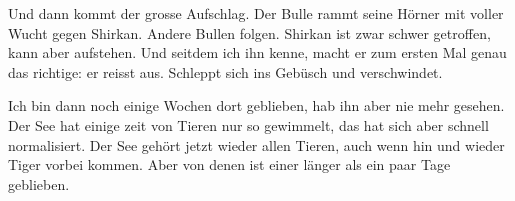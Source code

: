 Und dann kommt der grosse Aufschlag. Der Bulle rammt seine Hörner mit voller Wucht gegen Shirkan. Andere Bullen folgen. Shirkan ist zwar schwer getroffen, kann aber aufstehen. Und seitdem ich ihn kenne, macht er zum ersten Mal genau das richtige: er reisst aus. Schleppt sich ins Gebüsch und verschwindet. 

Ich bin dann noch einige Wochen dort geblieben, hab ihn aber nie mehr gesehen. Der See hat einige zeit von Tieren nur so gewimmelt, das hat sich aber schnell normalisiert. Der See gehört jetzt wieder allen Tieren, auch wenn hin und wieder Tiger vorbei kommen. Aber von denen ist einer länger als ein paar Tage geblieben.\hfill {\color{DeepPink}\decofourleft}
